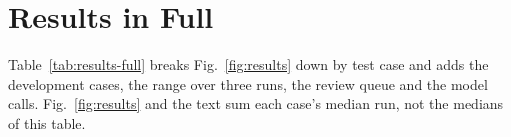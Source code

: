 
\section{Results in Full}\label{app:results}

Table~\ref{tab:results-full} breaks Fig.~\ref{fig:results} down by test case and adds the development cases, %
the range over three runs, the review queue and the model calls. Fig.~\ref{fig:results} and the text sum each %
case's median run, not the medians of this table. 

